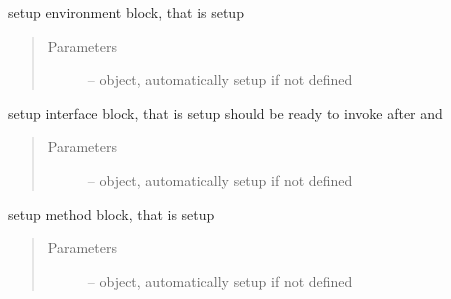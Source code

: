 \documentclass[letterpaper,10pt,english]{sphinxmanual}
\begin{document}
\begin{fulllineitems}
\begin{fulllineitems}
\begin{quote}
\begin{description}
\end{description}\end{quote}

\end{fulllineitems}


\begin{fulllineitems}
\label{\detokenize{src/apidocs/genopt:genopt.DakotaOC.set_environ}}
setup environment block, that is setup 
\begin{quote}\begin{description}
\item[{Parameters}] \leavevmode
{} --  object, automatically setup if not defined

\end{description}\end{quote}

\end{fulllineitems}


\begin{fulllineitems}
\label{\detokenize{src/apidocs/genopt:genopt.DakotaOC.set_interface}}
setup interface block, that is setup 
should be ready to invoke after  and 
\begin{quote}\begin{description}
\item[{Parameters}] \leavevmode
{} --  object, automatically setup if not defined

\end{description}\end{quote}

\end{fulllineitems}


\begin{fulllineitems}
\label{\detokenize{src/apidocs/genopt:genopt.DakotaOC.set_method}}
setup method block, that is setup 
\begin{quote}\begin{description}
\item[{Parameters}] \leavevmode
{} --  object, automatically setup if not defined


\end{description}
\end{quote}
\end{fulllineitems}
\end{fulllineitems}
\end{document}
